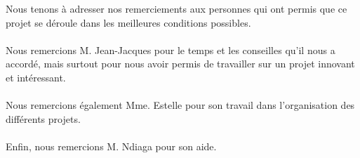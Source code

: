Nous tenons à adresser nos remerciements aux personnes qui ont permis que ce projet se déroule dans les meilleures conditions possibles.\\
\\
Nous remercions M. Jean-Jacques  pour le temps et les conseilles qu'il nous a accordé, mais surtout pour nous avoir permis de travailler sur un projet innovant et intéressant.\\
\\
Nous remercions également Mme. Estelle  pour son travail dans l'organisation des différents projets. \\
\\
Enfin, nous remercions M. Ndiaga  pour son aide. 

